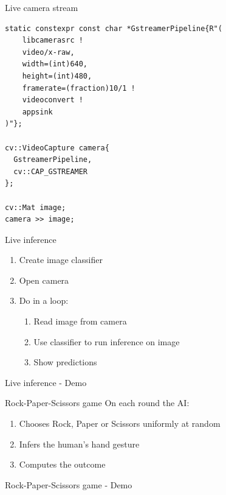 \begin{frame}[fragile]{Live camera stream}
  \lstset{basicstyle=\ttfamily\small, showstringspaces=false, numbers=left,
  columns=fullflexible}
  \begin{lstlisting}
static constexpr const char *GstreamerPipeline{R"(
    libcamerasrc !
    video/x-raw,
    width=(int)640,
    height=(int)480,
    framerate=(fraction)10/1 !
    videoconvert !
    appsink
)"};

cv::VideoCapture camera{
  GstreamerPipeline,
  cv::CAP_GSTREAMER
};

cv::Mat image;
camera >> image;
  \end{lstlisting}
\end{frame}

\begin{frame}{Live inference}
  \begin{enumerate}
	\item Create image classifier
	\item Open camera
	\item Do in a loop:
	\begin{enumerate}
	  \item Read image from camera
	  \item Use classifier to run inference on image
	  \item Show predictions
	\end{enumerate}
  \end{enumerate}
\end{frame}

\begin{frame}{Live inference - Demo}
\end{frame}

\begin{frame}{Rock-Paper-Scissors game}
On each round the AI:
  \begin{enumerate}
	\item Chooses Rock, Paper or Scissors uniformly at random
	\item Infers the human's hand gesture
	\item Computes the outcome
  \end{enumerate}
\end{frame}

\begin{frame}{Rock-Paper-Scissors game - Demo}
\end{frame}

